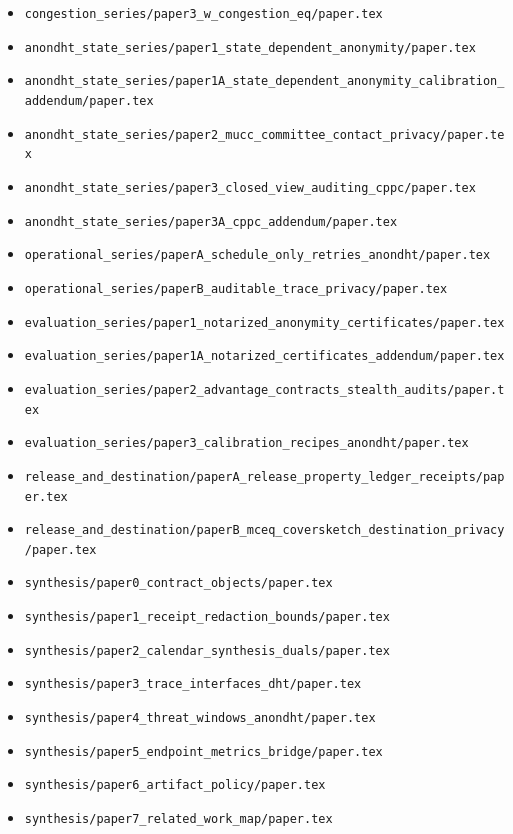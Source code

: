 \documentclass[11pt]{article}
\begin{document}
\begin{itemize}[leftmargin=*]
\item \texttt{congestion\_series/paper3\_w\_congestion\_eq/paper.tex}
\item \texttt{anondht\_state\_series/paper1\_state\_dependent\_anonymity/paper.tex}
\item \texttt{anondht\_state\_series/paper1A\_state\_dependent\_anonymity\_calibration\_addendum/paper.tex}
\item \texttt{anondht\_state\_series/paper2\_mucc\_committee\_contact\_privacy/paper.tex}
\item \texttt{anondht\_state\_series/paper3\_closed\_view\_auditing\_cppc/paper.tex}
\item \texttt{anondht\_state\_series/paper3A\_cppc\_addendum/paper.tex}
\item \texttt{operational\_series/paperA\_schedule\_only\_retries\_anondht/paper.tex}
\item \texttt{operational\_series/paperB\_auditable\_trace\_privacy/paper.tex}
\item \texttt{evaluation\_series/paper1\_notarized\_anonymity\_certificates/paper.tex}
\item \texttt{evaluation\_series/paper1A\_notarized\_certificates\_addendum/paper.tex}
\item \texttt{evaluation\_series/paper2\_advantage\_contracts\_stealth\_audits/paper.tex}
\item \texttt{evaluation\_series/paper3\_calibration\_recipes\_anondht/paper.tex}
\item \texttt{release\_and\_destination/paperA\_release\_property\_ledger\_receipts/paper.tex}
\item \texttt{release\_and\_destination/paperB\_mceq\_coversketch\_destination\_privacy/paper.tex}
\item \texttt{synthesis/paper0\_contract\_objects/paper.tex}
\item \texttt{synthesis/paper1\_receipt\_redaction\_bounds/paper.tex}
\item \texttt{synthesis/paper2\_calendar\_synthesis\_duals/paper.tex}
\item \texttt{synthesis/paper3\_trace\_interfaces\_dht/paper.tex}
\item \texttt{synthesis/paper4\_threat\_windows\_anondht/paper.tex}
\item \texttt{synthesis/paper5\_endpoint\_metrics\_bridge/paper.tex}
\item \texttt{synthesis/paper6\_artifact\_policy/paper.tex}
\item \texttt{synthesis/paper7\_related\_work\_map/paper.tex}

\end{itemize}
\end{document}
